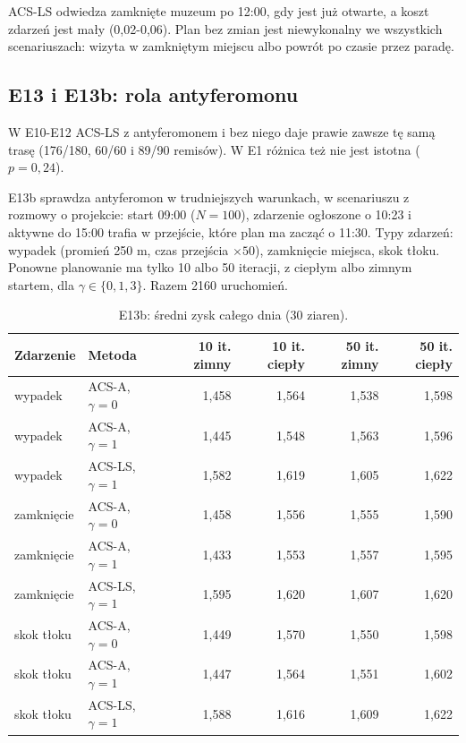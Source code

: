 \documentclass[11pt,a4paper]{article}
\begin{document}
ACS-LS odwiedza zamknięte muzeum po 12:00, gdy jest już otwarte, a koszt zdarzeń jest mały (0,02-0,06). Plan bez zmian jest niewykonalny we wszystkich scenariuszach: wizyta w zamkniętym miejscu albo powrót po czasie przez paradę.

\subsection{E13 i E13b: rola antyferomonu}

W E10-E12 ACS-LS z antyferomonem i bez niego daje prawie zawsze tę samą trasę (176/180, 60/60 i 89/90 remisów). W E1 różnica też nie jest istotna ($p = 0{,}24$).

E13b sprawdza antyferomon w trudniejszych warunkach, w scenariuszu z rozmowy o projekcie: start 09:00 ($N = 100$), zdarzenie ogłoszone o 10:23 i aktywne do 15:00 trafia w przejście, które plan ma zacząć o 11:30. Typy zdarzeń: wypadek (promień 250 m, czas przejścia $\times 50$), zamknięcie miejsca, skok tłoku. Ponowne planowanie ma tylko 10 albo 50 iteracji, z ciepłym albo zimnym startem, dla $\gamma \in \{0, 1, 3\}$. Razem 2160 uruchomień.

\begin{table}[h]
\centering
\caption{E13b: średni zysk całego dnia (30 ziaren).}
\begin{tabular}{llrrrr}
\toprule
Zdarzenie & Metoda & 10 it. zimny & 10 it. ciepły & 50 it. zimny & 50 it. ciepły \\
\midrule
wypadek & ACS-A, $\gamma=0$ & 1,458 & 1,564 & 1,538 & 1,598 \\
wypadek & ACS-A, $\gamma=1$ & 1,445 & 1,548 & 1,563 & 1,596 \\
wypadek & ACS-LS, $\gamma=1$ & 1,582 & 1,619 & 1,605 & 1,622 \\
zamknięcie & ACS-A, $\gamma=0$ & 1,458 & 1,556 & 1,555 & 1,590 \\
zamknięcie & ACS-A, $\gamma=1$ & 1,433 & 1,553 & 1,557 & 1,595 \\
zamknięcie & ACS-LS, $\gamma=1$ & 1,595 & 1,620 & 1,607 & 1,620 \\
skok tłoku & ACS-A, $\gamma=0$ & 1,449 & 1,570 & 1,550 & 1,598 \\
skok tłoku & ACS-A, $\gamma=1$ & 1,447 & 1,564 & 1,551 & 1,602 \\
skok tłoku & ACS-LS, $\gamma=1$ & 1,588 & 1,616 & 1,609 & 1,622 \\
\bottomrule
\end{tabular}
\end{table}
\end{document}
